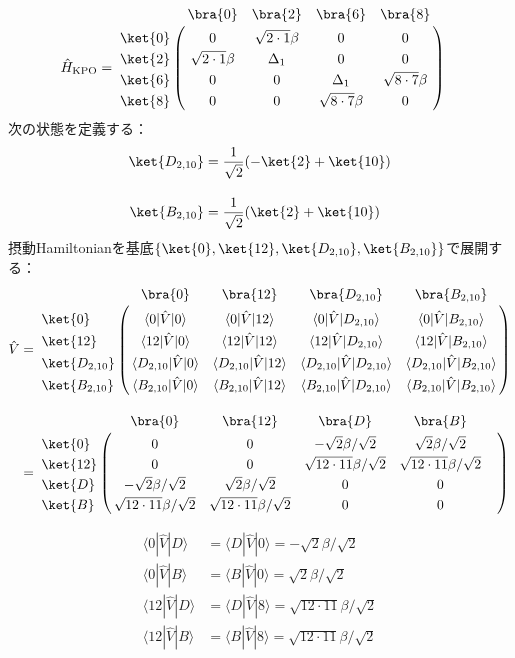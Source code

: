 \begin{align}
     \hat{H}_{\rm{KPO}}
    &=
   \bordermatrix{     
    & \bra{0} &  \bra{2} &  \bra{6}&  \bra{8}\cr
   \ket{0}&0&\sqrt{2\cdot1}\beta&0&0\cr
  \ket{2}&\sqrt{2\cdot1}\beta&\Delta_1&0&0\cr
  \ket{6}&0&0&\Delta_1&\sqrt{8\cdot7}\beta\cr
  \ket{8}&0&0&\sqrt{8\cdot7}\beta&0\cr
            }
\end{align}
次の状態を定義する：
\begin{align}
    \ket{D_{2,10}} &= \frac{1}{\sqrt{2}}(-\ket{2}+\ket{10})\\[10pt]
    \ket{B_{2,10}} &= \frac{1}{\sqrt{2}}(\ket{2}+\ket{10})
\end{align}
摂動Hamiltonianを基底$\{\ket{0},\ket{12},\ket{D_{2,10}},\ket{B_{2,10}}\}$で展開する：
\begin{align}
     \hat{V}
    &=
   \bordermatrix{     
    & \bra{0} &  \bra{12} &  \bra{D_{2,10}}&  \bra{B_{2,10}}\cr
   \ket{0}&\langle{0|\hat{V}|0}\rangle&\langle{0|\hat{V}|12}\rangle
   &\langle{0|\hat{V}|D_{2,10}}\rangle
   &\langle{0|\hat{V}|B_{2,10}}\rangle\cr
  \ket{12}&\langle{12|\hat{V}|0}\rangle&\langle{12|\hat{V}|12}\rangle&\langle{12|\hat{V}|D_{2,10}}\rangle
   &\langle{12|\hat{V}|B_{2,10}}\rangle\cr
  \ket{D_{2,10}}&\langle{D_{2,10}|\hat{V}|0}\rangle&\langle{D_{2,10}|\hat{V}|12}\rangle
  &\langle{D_{2,10}|\hat{V}|D_{2,10}}\rangle
   &\langle{D_{2,10}|\hat{V}|B_{2,10}}\rangle\cr
  \ket{B_{2,10}}&\langle{B_{2,10}|\hat{V}|0}\rangle&\langle{B_{2,10}|\hat{V}|12}\rangle&\langle{B_{2,10}|\hat{V}|D_{2,10}}\rangle
   &\langle{B_{2,10}|\hat{V}|B_{2,10}}\rangle\cr
    }\\[10pt]
    &=
   \bordermatrix{     
    & \bra{0} &  \bra{12} &  \bra{D}&  \bra{B}\cr
   \ket{0}&0&0&-\sqrt{2}\beta/\sqrt{2}&\sqrt{2}\beta/\sqrt{2}\cr
  \ket{12}&0&0&\sqrt{12\cdot11}\beta/\sqrt{2}&\sqrt{12\cdot11}\beta/\sqrt{2}\cr
  \ket{D}&-\sqrt{2}\beta/\sqrt{2}&\sqrt{2}\beta/\sqrt{2}&0&0\cr
  \ket{B}&\sqrt{12\cdot11}\beta/\sqrt{2}&\sqrt{12\cdot11}\beta/\sqrt{2}&0&0&\cr
            }
\end{align}

\begin{align}
    \langle{0|\hat{V}|D}\rangle&=\langle{D|\hat{V}|0}\rangle=-\sqrt{2}\beta/\sqrt{2}\\[10pt]
    \langle{0|\hat{V}|B}\rangle&=\langle{B|\hat{V}|0}\rangle=\sqrt{2}\beta/\sqrt{2}\\[10pt]
    \langle{12|\hat{V}|D}\rangle&=\langle{D|\hat{V}|8}\rangle=\sqrt{12\cdot11}\beta/\sqrt{2}\\[10pt]
   \langle{12|\hat{V}|B}\rangle&=\langle{B|\hat{V}|8}\rangle=\sqrt{12\cdot11}\beta/\sqrt{2}
\end{align}




